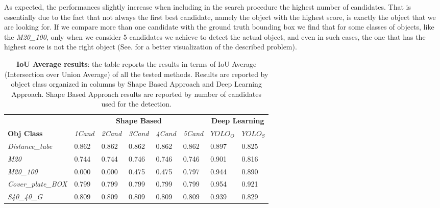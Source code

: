 As expected, the performances slightly increase when including in the search procedure the highest number of candidates. That is essentially due to the fact that not always the first best candidate, namely the object with the highest score, is exactly the object that we are looking for. If we compare more than one candidate with the ground truth bounding box we find that for some classes of objects, like the \emph{M20\_100}, only when we consider 5 candidates we achieve to detect the actual object, and even in such cases, the one that has the highest score is not the right object (See.  for a better visualization of the described problem).

\begin{table}[ht!]
 \centering

   \begin{tabular}{ llllllll }
   &\multicolumn{5}{c}{ \textbf{Shape Based} } &\multicolumn{2}{c}{ \textbf{Deep Learning} }\\
   \cmidrule(lr){2-6} \cmidrule(lr){7-8}
   \textbf{Obj Class} & \emph{1Cand} & \emph{2Cand} & \emph{3Cand} &\emph{4Cand} & \emph{5Cand} & $YOLO_O$ & $YOLO_S$\\
   \cmidrule(lr){1-8}   
   \emph{Distance\_tube} & 0.862 & 0.862 & 0.862 & 0.862 & 0.862 & \cellcolor{gray!25}0.897 & 0.825 \\ 
   \emph{M20} & 0.744 & 0.744 & 0.746 & 0.746 & 0.746 & \cellcolor{gray!25}0.901 & 0.816 \\ 
   \emph{M20\_100} & 0.000 & 0.000 & 0.475 & 0.475 & 0.797 & \cellcolor{gray!25}0.944 & 0.890 \\
   \emph{Cover\_plate\_BOX} & 0.799 & 0.799 & 0.799 & 0.799 & 0.799 & \cellcolor{gray!25}0.954 & 0.921 \\
   \emph{S40\_40\_G} & 0.809 & 0.809 & 0.809 & 0.809 & 0.809 & \cellcolor{gray!25}0.939 & 0.829 \\
   \end{tabular} 
   \caption{\textbf{IoU Average results}: the table reports the results in terms of IoU Average (Intersection over Union Average) of all the tested methods. Results are reported by object class organized in columns by Shape Based Approach and Deep Learning Approach. Shape Based Approach results are reported by number of candidates used for the detection.}
 \label{tab:big_table_results}
\end{table}

